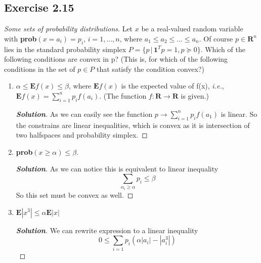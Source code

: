 \documentclass[12pt]{article}
\newenvironment{Solution}
  {\begin{proof}[\textbf{Solution}]}
  {\end{proof}}
\begin{document}
\subsection*{Exercise 2.15}
\textit{Some sets of probability distributions}. Let \(x\) be a real-valued random variable with \textbf{prob}\((x = a_i) = p_i\), \(i = 1,...,n\), where \(a_1 \leq a_2 \leq ... \leq a_n\). Of course \(p \in \mathbf{R}^n\) lies in the standard probability simplex \(P = \{p \, | \, \mathbf{1}^T p = 1, p \succeq 0\}\).
Which of the following conditions are convex in p? (This is, for which of the following conditions in the set of \(p \in P\) that satisfy the condition convex?)
\begin{enumerate}[label=(\alph*)]
	\item
	      \(\alpha \leq \mathbf{E}f(x) \leq \beta\), where \(\mathbf{E}f(x)\) is the expected value of f(x), \textit{i.e.}, \(\mathbf{E}f(x) = \sum_{i=1}^n p_i f(a_i)\). (The function \(f:\mathbf{R} \rightarrow \mathbf{R}\) is given.)
	      \begin{Solution}
		      As we can easily see the function \(p \rightarrow \sum_{i=1}^n p_i f(a_1)\) is linear. So the constrains are linear inequalities, which is convex as it is intersection of two halfspaces and probability simplex.
	      \end{Solution}

	\item
	      \textbf{prob}\((x \ge \alpha) \leq \beta\).
	      \begin{Solution}
		      As we can notice this is equivalent to linear inequality
		      \[
			      \sum_{\alpha_i \ge \alpha}p_i \leq \beta
		      \]
		      So this set must be convex as well.
	      \end{Solution}

	\item
	      \(\mathbf{E}|x^3| \leq \alpha \mathbf{E} |x|\)
	      \begin{Solution}
		      We can rewrite expression to a linear inequality
		      \[
			      0 \leq \sum_{i=1} p_i(\alpha |a_i| - |a_i^3|)
		      \]
	      \end{Solution}
\end{enumerate}
\end{document}
